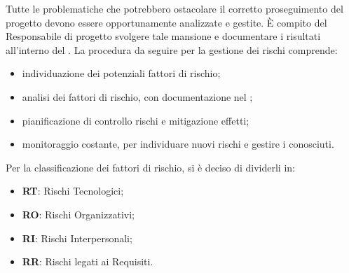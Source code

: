 			
			Tutte le problematiche che potrebbero ostacolare il corretto proseguimento del progetto devono essere opportunamente analizzate e gestite. È compito del Responsabile di progetto svolgere tale mansione e documentare i risultati all'interno del \PdP{}. La procedura da seguire per la gestione dei rischi comprende:
			\begin{itemize}
				\item individuazione dei potenziali fattori di rischio;
				\item analisi dei fattori di rischio, con documentazione nel \PdP{};
				\item pianificazione di controllo rischi e mitigazione effetti;
				\item monitoraggio costante, per individuare nuovi rischi e gestire i conosciuti.
			\end{itemize}
			Per la classificazione dei fattori di rischio, si è deciso di dividerli in:
			\begin{itemize}
				\item \textbf{RT}: Rischi Tecnologici;
				\item \textbf{RO}: Rischi Organizzativi;
				\item \textbf{RI}: Rischi Interpersonali;
				\item \textbf{RR}: Rischi legati ai Requisiti.
			\end{itemize}
